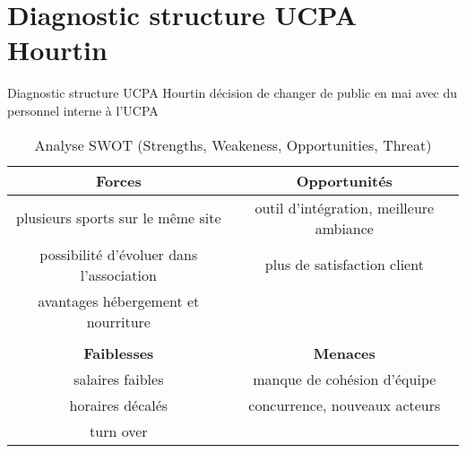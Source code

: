 \documentclass[10pt,a4paper]{beamer}
\begin{document}



\section{Diagnostic structure UCPA Hourtin}
\begin{frame}{Diagnostic structure UCPA Hourtin}
décision de changer de public en mai avec du personnel interne à l'UCPA

\small{
\begin{table}[h]
\centering
\begin{tabular}{|c|c|}
        \hline
        \textbf{Forces}                          & \textbf{Opportunités} \\ 
        \hline
        plusieurs sports sur le m\^eme site      &outil d'intégration, meilleure ambiance\\
        possibilité d'évoluer dans l'association & plus de satisfaction client  \\
        avantages hébergement et nourriture      &                              \\
               &                             \\
        \hline
        \textbf{Faiblesses}                      &  \textbf{Menaces} \\ 
        \hline
        salaires faibles                         & manque de cohésion d'équipe \\
        horaires décalés                         & concurrence, nouveaux acteurs   \\
        turn over                                &                               \\
        \hline
\end{tabular}
\caption{Analyse SWOT (Strengths, Weakeness, Opportunities, Threat)\label{swot}}
\end{table}}
\end{frame}
\end{document}
